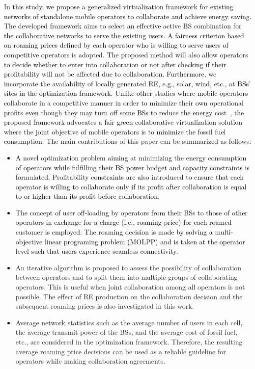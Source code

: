 \documentclass[10pt, letter, twocolumn]{IEEEtran}
\begin{document}
\textcolor{black}{In this study, we propose a generalized virtualization framework for existing networks of standalone mobile operators to collaborate and achieve energy saving. The developed framework aims to select an effective active BS combination for the collaborative networks to serve the existing users. A fairness criterion based on roaming prices defined by each operator who is willing to serve users of competitive operators is adopted. The proposed method will also allow operators to decide whether to enter into collaboration or not after checking if their profitability will not be affected due to collaboration.}
\textcolor{black}{Furthermore, we incorporate the availability of locally generated RE, e.g., solar, wind, etc., at BSs' sites in the optimization framework. Unlike other studies where mobile operators collaborate in a competitive manner in order to minimize their own operational profits even though they may turn off some BSs to reduce the energy cost~\cite{7124517}, the proposed framework advocates a fair green collaborative virtualization solution where the joint objective of mobile operators is to minimize the fossil fuel consumption.} The main contributions of this paper can be summarized as follows:
\begin{itemize}
  \item \textcolor{black}{A novel optimization problem aiming at minimizing the energy consumption of operators while fulfilling their BS power budget and capacity constraints is formulated. Profitability constraints are also introduced to ensure that each operator is willing to collaborate only if its profit after collaboration is equal to or higher than its profit before collaboration.}
\item \textcolor{black}{The concept of user off-loading by operators from their BSs to those of other operators in exchange for a charge (i.e., roaming price) for each roamed customer is employed. The roaming decision is made by solving a multi-objective linear programing problem (MOLPP) and is taken at the operator level such that users experience seamless connectivity.}
  \item An iterative algorithm is proposed to assess the possibility of collaboration between operators and to split them into multiple groups of collaborating operators. This is useful when joint collaboration among all operators is not possible. The effect of RE production on the collaboration decision and the subsequent roaming prices is also investigated in this work.
  \item Average network statistics such as the average number of users in each cell, the average transmit power of the BSs, and the average cost of fossil fuel, etc., are considered in the optimization framework. Therefore, the resulting average roaming price decisions can be used as a reliable guideline for operators while making collaboration agreements.
\end{itemize}
\end{document}
